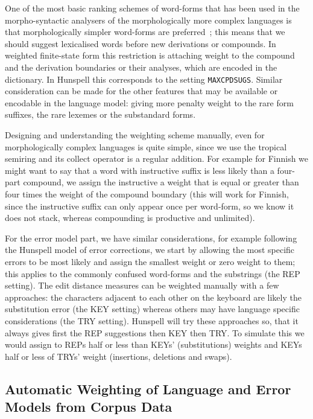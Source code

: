 \documentclass[a4paper,12pt]{article}
\begin{document}
One of the most basic ranking schemes of word-forms that has been used in the
morpho-syntactic analysers of the morphologically more complex languages is
that morphologically simpler word-forms are
preferred~\cite[]{karlsson1992swetwol}; this means that we should suggest
lexicalised words before new derivations or compounds.  In weighted
finite-state form this restriction is attaching weight to the compound and the
derivation boundaries or their analyses, which are encoded in the dictionary.
In Hunspell this corresponds to the setting \texttt{MAXCPDSUGS}. Similar
consideration can be made for the other features that may be available or
encodable in the language model: giving more penalty weight to the rare form
suffixes, the rare lexemes or the substandard forms.

Designing and understanding the weighting scheme manually, even for
morphologically complex languages is quite simple, since we use the tropical
semiring and its collect operator is a regular addition. For example for
Finnish we might want to say that a word with instructive suffix is less likely
than a four-part compound, we assign the instructive a weight that is equal or
greater than four times the weight of the compound boundary (this will work for
Finnish, since the instructive suffix can only appear once per word-form, so we
know it does not stack, whereas compounding is productive and unlimited).

For the error model part, we have similar considerations, for example
following the Hunspell model of error corrections, we start by allowing the
most specific errors to be most likely and assign the smallest weight or zero
weight to them; this applies to the commonly confused word-forms and the
substrings (the REP setting). The edit distance measures can be weighted
manually with a few approaches: the characters adjacent to each other on the
keyboard are likely the substitution error (the KEY setting) whereas others
may have language specific considerations (the TRY setting).  Hunspell will try
these approaches so, that it always gives first the REP suggestions then KEY
then TRY. To simulate this we would assign to REPs half or less than KEYs'
(substitutions) weights and KEYs half or less of TRYs' weight (insertions,
deletions and swaps).

\subsection{Automatic Weighting of Language and Error Models from Corpus Data}
\label{subsec:automatic-weighting}
\end{document}
